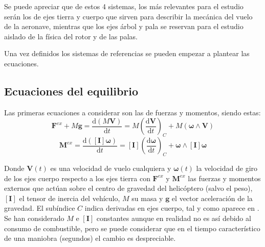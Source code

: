 Se puede apreciar que de estos 4 sistemas, los más relevantes para el estudio serán los de ejes tierra y cuerpo que sirven para describir la mecánica del vuelo de la aeronave, mientras que los ejes árbol y pala se reservan para el estudio aislado de la física del rotor y de las palas.\

Una vez definidos los sistemas de referencias se pueden empezar a plantear las ecuaciones.

\subsection{Ecuaciones del equilibrio}
Las primeras ecuaciones a considerar  son las de fuerzas y momentos, siendo estas:
\begin{equation}
\mathrm{\textbf{F}}^{ex}+M\mathrm{\textbf{g}}=\frac{\mathrm{d}(M\mathrm{\textbf{V}})}{\mathrm{d}t}=M\left(\frac{\mathrm{d\textbf{V}}}{\mathrm{d}t}\right)_{C}+M(\boldsymbol{\omega}\wedge\mathrm{\textbf{V}})
\label{EqF}
\end{equation}
\begin{equation}
\mathrm{\textbf{M}}^{ex}=\frac{\mathrm{d}([\mathrm{\textbf{I}}]\boldsymbol{\omega})}{\mathrm{d}t}=[\mathrm{\textbf{I}}]\left(\frac{\mathrm{d}\boldsymbol{\omega}}{\mathrm{d}t}\right)_C+\boldsymbol{\omega}\wedge[\mathrm{\textbf{I}}]\boldsymbol{\omega}
\label{EqM}
\end{equation}

Donde $\mathrm{\textbf{V}}(t)$ es una velocidad de vuelo cualquiera y $\boldsymbol{\omega}(t)$ la velocidad de giro de los ejes cuerpo respecto a los ejes tierra con $\mathrm{\textbf{F}}^{ex}$ y $\mathrm{\textbf{M}}^{ex}$ las fuerzas y momentos externos que actúan sobre el centro de gravedad del helicóptero (salvo el peso), $[\mathrm{\textbf{I}}]$ el tensor de inercia del vehículo, $M$ su masa y $\mathrm{\textbf{g}}$ el vector aceleración de la gravedad. El subíndice $C$ indica derivadas en ejes cuerpo, tal y como aparece en \citet{Cuerva}. Se han considerado $M$ e $[\mathrm{\textbf{I}}]$ constantes aunque en realidad no es así debido al consumo de combustible, pero se puede considerar que en el tiempo característico de una maniobra (segundos) el cambio es despreciable.\\

